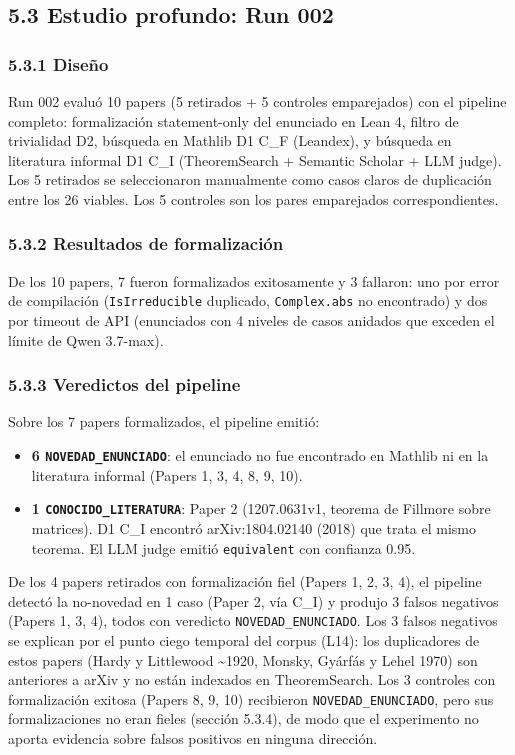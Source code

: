 \documentclass[12pt,a4paper]{article}
\theoremstyle{remark}
\begin{document}
\subsection{5.3 Estudio profundo: Run 002}

\subsubsection{5.3.1 Diseño}

Run 002 evaluó 10 papers (5 retirados + 5 controles emparejados) con el pipeline completo: formalización statement-only del enunciado en Lean 4, filtro de trivialidad D2, búsqueda en Mathlib D1 C\_F (Leandex), y búsqueda en literatura informal D1 C\_I (TheoremSearch + Semantic Scholar + LLM judge). Los 5 retirados se seleccionaron manualmente como casos claros de duplicación entre los 26 viables. Los 5 controles son los pares emparejados correspondientes.


\subsubsection{5.3.2 Resultados de formalización}

De los 10 papers, 7 fueron formalizados exitosamente y 3 fallaron: uno por error de compilación (\texttt{IsIrreducible} duplicado, \texttt{Complex.abs} no encontrado) y dos por timeout de API (enunciados con 4 niveles de casos anidados que exceden el límite de Qwen 3.7-max).


\subsubsection{5.3.3 Veredictos del pipeline}

Sobre los 7 papers formalizados, el pipeline emitió:

\begin{itemize}
\item \textbf{6 \texttt{NOVEDAD\_ENUNCIADO}}: el enunciado no fue encontrado en Mathlib ni en la literatura informal (Papers 1, 3, 4, 8, 9, 10).
\item \textbf{1 \texttt{CONOCIDO\_LITERATURA}}: Paper 2 (1207.0631v1, teorema de Fillmore sobre matrices). D1 C\_I encontró arXiv:1804.02140 (2018) que trata el mismo teorema. El LLM judge emitió \texttt{equivalent} con confianza 0.95.
\end{itemize}


De los 4 papers retirados con formalización fiel (Papers 1, 2, 3, 4), el pipeline detectó la no-novedad en 1 caso (Paper 2, vía C\_I) y produjo 3 falsos negativos (Papers 1, 3, 4), todos con veredicto \texttt{NOVEDAD\_ENUNCIADO}. Los 3 falsos negativos se explican por el punto ciego temporal del corpus (L14): los duplicadores de estos papers (Hardy y Littlewood \textasciitilde{}1920, Monsky, Gyárfás y Lehel 1970) son anteriores a arXiv y no están indexados en TheoremSearch. Los 3 controles con formalización exitosa (Papers 8, 9, 10) recibieron \texttt{NOVEDAD\_ENUNCIADO}, pero sus formalizaciones no eran fieles (sección 5.3.4), de modo que el experimento no aporta evidencia sobre falsos positivos en ninguna dirección.
\end{document}
